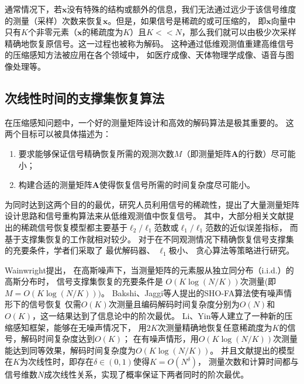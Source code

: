 \documentclass[AutoFakeBold]{LZUThesis}
\begin{document}
通常情况下，若$\mathbf{x}$没有特殊的结构或额外的信息，我们无法通过远少于该信号维度的测量（采样）次数来恢复$\mathbf{x}$。但是，如果信号是稀疏的或可压缩的，
即$\mathbf{x}$向量中只有$K$个非零元素（$\mathbf{x}$的稀疏度为$K$）且$K << N$，那么我们就可以由极少次采样精确地恢复原信号。这一过程也被称为解码。
这种通过低维观测值重建高维信号的压缩感知方法被应用在各个领域中，
如医疗成像、天体物理学成像、语音与图像处理等。

\subsection{次线性时间的支撑集恢复算法}

在压缩感知问题中，一个好的测量矩阵设计和高效的解码算法是极其重要的。
这两个目标可以被具体描述为：
\begin{enumerate}
    \item 要求能够保证信号精确恢复所需的观测次数$M$（即测量矩阵$\mathbf{A}$的行数）尽可能小；
    \item 构建合适的测量矩阵$\mathbf{A}$使得恢复信号所需的时间复杂度尽可能小。
\end{enumerate}

为同时达到这两个目的的最优，研究人员利用信号的稀疏性，提出了大量测量矩阵设计思路和信号重构算法来从低维观测值中恢复信号。
其中，大部分相关文献提出的稀疏信号恢复模型都主要基于$\ell_2 / \ell_1$范数或$\ell_1 / \ell_1$范数的近似误差指标，
而基于支撑集恢复\cite{gilbert2010sparse}的工作就相对较少。
对于在不同观测情况下精确恢复信号支撑集的充要条件，学者们采取了
最优解码器、
$\ell_1$极小、
贪心算法等策略进行研究。

Wainwright提出，
在高斯噪声下，当测量矩阵的元素服从独立同分布（i.i.d.）的高斯分布时，
信号支撑集恢复的充要条件是
$O(K \log(N/K))$次测量(即$M = O(K \log(N/K)))$。
Bakshi、Jaggi等人提出的SHO-FA算法使有噪声情形下的信号恢复
仅需$O(K)$次测量且编码解码时间复杂度分别为$O(N)$和$O(K)$，这一结果达到了信息论中的阶次最优。
Li、Yin等人建立了一种新的压缩感知框架，能够在无噪声情况下，
用$2K$次测量精确地恢复任意稀疏度为$K$的信号，解码时间复杂度达到$O(K)$；
在有噪声情形，用$O(K \log(N/K))$次测量能达到同等效果，解码时间复杂度为$O(K \log(N/K))$。
并且文献提出的模型在$K$为次线性时，即存在$\delta \in (0,1)$使得$K = O(N^\delta)$，
测量次数和计算时间都与信号维数$N$成次线性关系，实现了概率保证下两者同时的阶次最优。
\end{document}
